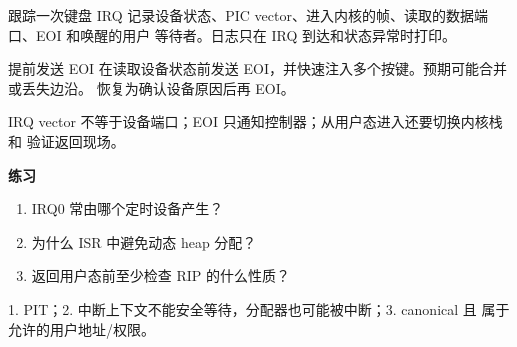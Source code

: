 
\begin{experimentbox}{跟踪一次键盘 IRQ}
记录设备状态、PIC vector、进入内核的帧、读取的数据端口、EOI 和唤醒的用户
等待者。日志只在 IRQ 到达和状态异常时打印。
\end{experimentbox}

\begin{faultinjectionbox}{提前发送 EOI}
在读取设备状态前发送 EOI，并快速注入多个按键。预期可能合并或丢失边沿。
恢复为确认设备原因后再 EOI。
\end{faultinjectionbox}

\begin{pitfallbox}
IRQ vector 不等于设备端口；EOI 只通知控制器；从用户态进入还要切换内核栈和
验证返回现场。
\end{pitfallbox}

\textbf{练习}
\begin{enumerate}[leftmargin=2.2em]
  \item IRQ0 常由哪个定时设备产生？
  \item 为什么 ISR 中避免动态 heap 分配？
  \item 返回用户态前至少检查 RIP 的什么性质？
\end{enumerate}
\begin{answerbox}
1. PIT；2. 中断上下文不能安全等待，分配器也可能被中断；3. canonical 且
属于允许的用户地址/权限。
\end{answerbox}
